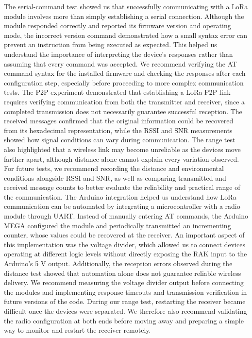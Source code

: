 The serial-command test showed us that successfully communicating with a LoRa module involves more than simply establishing a serial connection. Although the module responded correctly and reported its firmware version and operating mode, the incorrect version command demonstrated how a small syntax error can prevent an instruction from being executed as expected. This helped us understand the importance of interpreting the device's responses rather than assuming that every command was accepted. We recommend verifying the AT command syntax for the installed firmware and checking the responses after each configuration step, especially before proceeding to more complex communication tests. The P2P experiment demonstrated that establishing a LoRa P2P link requires verifying communication from both the transmitter and receiver, since a completed transmission does not necessarily guarantee successful reception. The received messages confirmed that the original information could be recovered from its hexadecimal representation, while the RSSI and SNR measurements showed how signal conditions can vary during communication. The range test also highlighted that a wireless link may become unreliable as the devices move farther apart, although distance alone cannot explain every variation observed. For future tests, we recommend recording the distance and environmental conditions alongside RSSI and SNR, as well as comparing transmitted and received message counts to better evaluate the reliability and practical range of the communication. The Arduino integration helped us understand how LoRa communication can be automated by integrating a microcontroller with a radio module through UART. Instead of manually entering AT commands, the Arduino MEGA configured the module and periodically transmitted an incrementing counter, whose values could be recovered at the receiver. An important aspect of this implementation was the voltage divider, which allowed us to connect devices operating at different logic levels without directly exposing the RAK input to the Arduino's 5 V output. Additionally, the reception errors observed during the distance test showed that automation alone does not guarantee reliable wireless delivery. We recommend measuring the voltage divider output before connecting the modules and implementing response timeouts and transmission verification in future versions of the code. During our range test, restarting the receiver became difficult once the devices were separated. We therefore also recommend validating the radio configuration at both ends before moving away and preparing a simple way to monitor and restart the receiver remotely.
